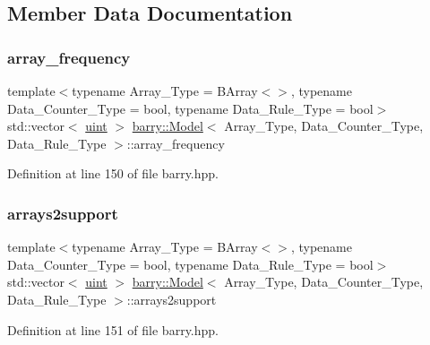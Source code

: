 \subsection{Member Data Documentation}
\mbox{\label{classbarry_1_1_model_a64041df6ecac9aface20f9d13c0b22eb}} 
\subsubsection{\texorpdfstring{array\+\_\+frequency}{array\_frequency}}
{\footnotesize\ttfamily template$<$typename Array\+\_\+\+Type  = B\+Array$<$$>$, typename Data\+\_\+\+Counter\+\_\+\+Type  = bool, typename Data\+\_\+\+Rule\+\_\+\+Type  = bool$>$ \\
std\+::vector$<$ \hyperlink{namespacebarry_a11dfc53ddb4672278319aa04f1e09a6c}{uint} $>$ \hyperlink{classbarry_1_1_model}{barry\+::\+Model}$<$ Array\+\_\+\+Type, Data\+\_\+\+Counter\+\_\+\+Type, Data\+\_\+\+Rule\+\_\+\+Type $>$\+::array\+\_\+frequency}



Definition at line 150 of file barry.\+hpp.

\mbox{\label{classbarry_1_1_model_a9cd0e9c9d29df6637ab30ebe3daeeff7}} 
\subsubsection{\texorpdfstring{arrays2support}{arrays2support}}
{\footnotesize\ttfamily template$<$typename Array\+\_\+\+Type  = B\+Array$<$$>$, typename Data\+\_\+\+Counter\+\_\+\+Type  = bool, typename Data\+\_\+\+Rule\+\_\+\+Type  = bool$>$ \\
std\+::vector$<$ \hyperlink{namespacebarry_a11dfc53ddb4672278319aa04f1e09a6c}{uint} $>$ \hyperlink{classbarry_1_1_model}{barry\+::\+Model}$<$ Array\+\_\+\+Type, Data\+\_\+\+Counter\+\_\+\+Type, Data\+\_\+\+Rule\+\_\+\+Type $>$\+::arrays2support}



Definition at line 151 of file barry.\+hpp.

\mbox{\label{classbarry_1_1_model_ada40ca4ec8b21a3dbbe646edbfb1df45}} 
